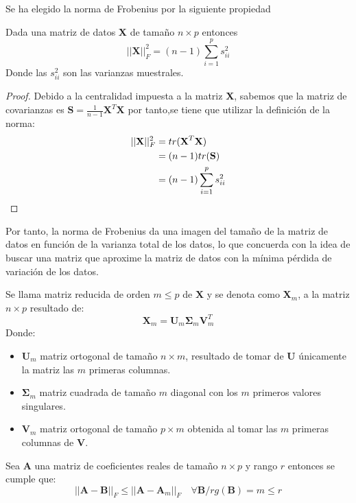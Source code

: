 \noindent Se ha elegido la norma de Frobenius por la siguiente propiedad
\begin{propo}
Dada una matriz de datos \textbf{X} de tamaño $n\times p$ entonces
\begin{equation}
||\textbf{X}||_F^2=(n-1)\sum_{i=1}^p s_{ii}^2
\end{equation}
Donde las $s_{ii}^2$ son las varianzas muestrales.
\begin{proof}
Debido a la centralidad impuesta a la matriz \textbf{X}, sabemos que la matriz de covarianzas es $\textbf{S}=\frac{1}{n-1}\textbf{X}^T \textbf{X}$ por tanto,se tiene que utilizar la definición de la norma:
\begin{align*}
||\textbf{X}||_F^2 &= tr(\textbf{X}^T\textbf{X})\\
&= (n-1) tr(\textbf{S})\\
&= (n-1) \sum_{i=1}^p s_{ii}^2 \qedhere
\end{align*}
\end{proof}
\end{propo}
\noindent Por tanto, la norma de Frobenius da una imagen del tamaño de la matriz de datos en función de la varianza total de los datos, lo que concuerda con la idea de buscar una matriz que aproxime la matriz de datos con la mínima pérdida de variación de los datos.  

\begin{defi}
Se llama matriz reducida de orden $m\leq p$ de $\textbf{X}$ y se denota como $\textbf{X}_m$, a la matriz $n\times p$ resultado de:
\begin{equation}
\textbf{X}_m=\textbf{U}_m\mathbf{\Sigma}_m\textbf{V}^T_m
\end{equation}
Donde:
\begin{itemize}
\item $\textbf{U}_m$ matriz ortogonal de tamaño $n \times m$, resultado de tomar de \textbf{U} únicamente la matriz las $m$ primeras columnas. 
\item $\mathbf{\Sigma}_m$  matriz cuadrada de tamaño $m$ diagonal con los $m$ primeros valores singulares. 
\item $\textbf{V}_m$ matriz ortogonal de tamaño $p \times m$ obtenida al tomar las $m$ primeras columnas de \textbf{V}.
\end{itemize}
\end{defi}

\begin{teorema}
Sea \textbf{A} una matriz de coeficientes reales de tamaño $n\times p$ y rango $r$  entonces se cumple que:
\begin{equation}
||\textbf{A}-\textbf{B}||_F\leq ||\textbf{A}-\textbf{A}_m||_F \quad \forall \textbf{B}/ rg(\textbf{B})=m \leq r
\end{equation} 
\end{teorema}

